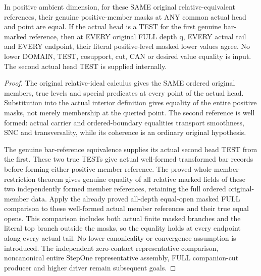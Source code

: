 \begin{theorem}
\label{hir:original-relative-ideal-positive-head-values}
\leanok
In positive ambient dimension, for these SAME original relative-equivalent
references, their genuine positive-member masks at ANY common actual head
and point are equal. If the actual head is a TEST for the first genuine
bar-marked reference, then at EVERY original FULL depth q, EVERY actual
tail and EVERY endpoint, their literal positive-level masked lower values
agree. No lower DOMAIN, TEST, cosupport, cut, CAN or desired value equality
is input. The second actual head TEST is supplied internally.
\end{theorem}
\begin{proof}
The original relative-ideal calculus gives the SAME ordered original
members, true levels and special predicates at every point of the actual
head. Substitution into the actual interior definition gives equality of
the entire positive masks, not merely membership at the queried point.
The second reference is well formed: actual carrier and ordered-boundary
equalities transport smoothness, SNC and transversality, while its
coherence is an ordinary original hypothesis.

The genuine bar-reference equivalence supplies its actual second head
TEST from the first. These two true TESTs give actual well-formed
transformed bar records before forming either positive member reference.
The proved whole member-restriction theorem gives genuine equality of
all relative marked fields of these two independently formed member
references, retaining the full ordered original-member data. Apply the
already proved all-depth equal-open masked FULL comparison to these
well-formed actual member references and their true equal opens. This
comparison includes both actual finite masked branches and the literal
top branch outside the masks, so the equality holds at every endpoint
along every actual tail. No lower canonicality or convergence assumption
is introduced. The independent zero-contact representative comparison,
noncanonical entire StepOne representative assembly, FULL companion-cut
producer and higher driver remain subsequent goals.
\end{proof}
